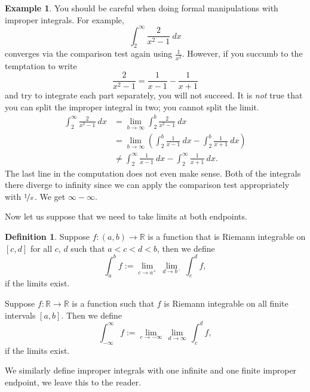 \documentclass[12pt]{book}
\newcommand{\R}{{\mathbb{R}}}
\theoremstyle{plain}
\theoremstyle{remark}
\theoremstyle{definition}
\newtheorem{defn}[thm]{Definition}
\theoremstyle{exercise}
\theoremstyle{example}
\newtheorem{example}[thm]{Example}
\begin{document}
\begin{example}
You should be careful when doing formal manipulations with improper
integrals.
For example,
\begin{equation*}
\int_2^\infty \frac{2}{x^2-1}~dx
\end{equation*}
converges via the comparison test again using $\frac{1}{x^2}$.  However, if you
succumb to the temptation to write
\begin{equation*}
\frac{2}{x^2-1} = 
\frac{1}{x-1}
-
\frac{1}{x+1} 
\end{equation*}
and try to integrate each part separately, you will not succeed.
It is \emph{not} true that you can split the improper
integral in two; you cannot split the limit.
\begin{equation*}
\begin{split}
\int_2^\infty \frac{2}{x^2-1} ~dx &=
\lim_{b\to \infty} \int_2^b \frac{2}{x^2-1} ~dx
\\
&=
\lim_{b\to \infty}
\left(
\int_2^b \frac{1}{x-1}~dx
-
\int_2^b \frac{1}{x+1}~dx
\right)
\\
&\not=
\int_2^\infty \frac{1}{x-1}~dx
-
\int_2^\infty \frac{1}{x+1}~dx .
\end{split}
\end{equation*}
The last line in the computation does not even make sense.  Both of the
integrals there diverge to infinity since we can
apply the comparison test appropriately with
$\nicefrac{1}{x}$.  We get $\infty - \infty$.
\end{example}

Now let us suppose that we need to take limits at both endpoints.

\begin{defn}
Suppose $f \colon (a,b) \to \R$ is a function
that is Riemann integrable on $[c,d]$ for all $c$, $d$
such that $a < c < d < b$, then we define
\begin{equation*}
\int_a^b f := \lim_{c \to a^+} \, \lim_{d \to b^-} \, \int_{c}^{d} f ,
\end{equation*}
if the limits exist.

Suppose $f \colon \R \to \R$ is a function such that
$f$ is Riemann integrable on all finite intervals $[a,b]$.  Then
we define
\begin{equation*}
\int_{-\infty}^\infty f := \lim_{c \to -\infty} \, \lim_{d \to \infty} \, \int_c^d f ,
\end{equation*}
if the limits exist.

We similarly define improper integrals with one infinite and one finite
improper endpoint, we leave this to the reader.
\end{defn}
\end{document}
